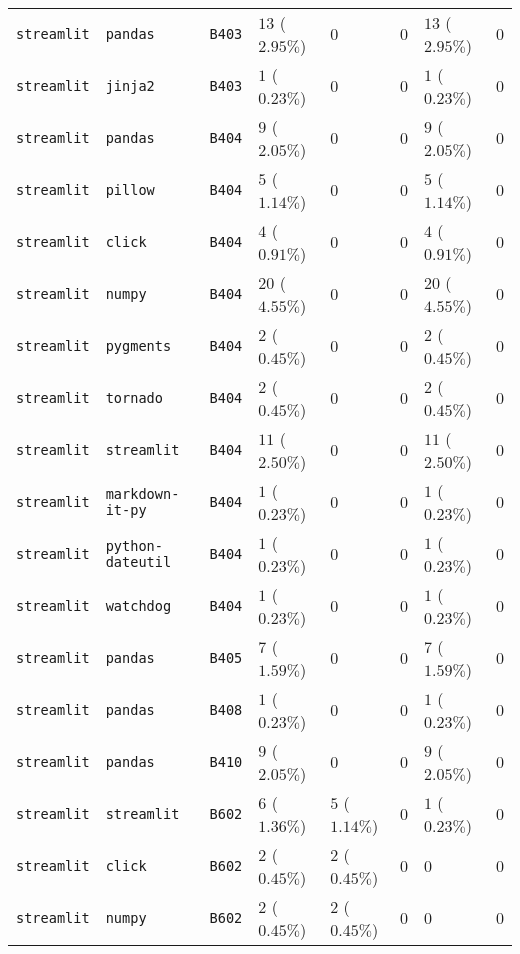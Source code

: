 \begin{table}
\begin{tabular}{llllllll}
\texttt{streamlit} & \texttt{pandas} & \texttt{B403} & $13$ ($2.95\%$) & $0$ & $0$ & $13$ ($2.95\%$) & $0$ \\
\texttt{streamlit} & \texttt{jinja2} & \texttt{B403} & $1$ ($0.23\%$) & $0$ & $0$ & $1$ ($0.23\%$) & $0$ \\
\texttt{streamlit} & \texttt{pandas} & \texttt{B404} & $9$ ($2.05\%$) & $0$ & $0$ & $9$ ($2.05\%$) & $0$ \\
\texttt{streamlit} & \texttt{pillow} & \texttt{B404} & $5$ ($1.14\%$) & $0$ & $0$ & $5$ ($1.14\%$) & $0$ \\
\texttt{streamlit} & \texttt{click} & \texttt{B404} & $4$ ($0.91\%$) & $0$ & $0$ & $4$ ($0.91\%$) & $0$ \\
\texttt{streamlit} & \texttt{numpy} & \texttt{B404} & $20$ ($4.55\%$) & $0$ & $0$ & $20$ ($4.55\%$) & $0$ \\
\texttt{streamlit} & \texttt{pygments} & \texttt{B404} & $2$ ($0.45\%$) & $0$ & $0$ & $2$ ($0.45\%$) & $0$ \\
\texttt{streamlit} & \texttt{tornado} & \texttt{B404} & $2$ ($0.45\%$) & $0$ & $0$ & $2$ ($0.45\%$) & $0$ \\
\texttt{streamlit} & \texttt{streamlit} & \texttt{B404} & $11$ ($2.50\%$) & $0$ & $0$ & $11$ ($2.50\%$) & $0$ \\
\texttt{streamlit} & \texttt{markdown-it-py} & \texttt{B404} & $1$ ($0.23\%$) & $0$ & $0$ & $1$ ($0.23\%$) & $0$ \\
\texttt{streamlit} & \texttt{python-dateutil} & \texttt{B404} & $1$ ($0.23\%$) & $0$ & $0$ & $1$ ($0.23\%$) & $0$ \\
\texttt{streamlit} & \texttt{watchdog} & \texttt{B404} & $1$ ($0.23\%$) & $0$ & $0$ & $1$ ($0.23\%$) & $0$ \\
\texttt{streamlit} & \texttt{pandas} & \texttt{B405} & $7$ ($1.59\%$) & $0$ & $0$ & $7$ ($1.59\%$) & $0$ \\
\texttt{streamlit} & \texttt{pandas} & \texttt{B408} & $1$ ($0.23\%$) & $0$ & $0$ & $1$ ($0.23\%$) & $0$ \\
\texttt{streamlit} & \texttt{pandas} & \texttt{B410} & $9$ ($2.05\%$) & $0$ & $0$ & $9$ ($2.05\%$) & $0$ \\
\texttt{streamlit} & \texttt{streamlit} & \texttt{B602} & $6$ ($1.36\%$) & $5$ ($1.14\%$) & $0$ & $1$ ($0.23\%$) & $0$ \\
\texttt{streamlit} & \texttt{click} & \texttt{B602} & $2$ ($0.45\%$) & $2$ ($0.45\%$) & $0$ & $0$ & $0$ \\
\texttt{streamlit} & \texttt{numpy} & \texttt{B602} & $2$ ($0.45\%$) & $2$ ($0.45\%$) & $0$ & $0$ & $0$ \\

\end{tabular}
\end{table}
